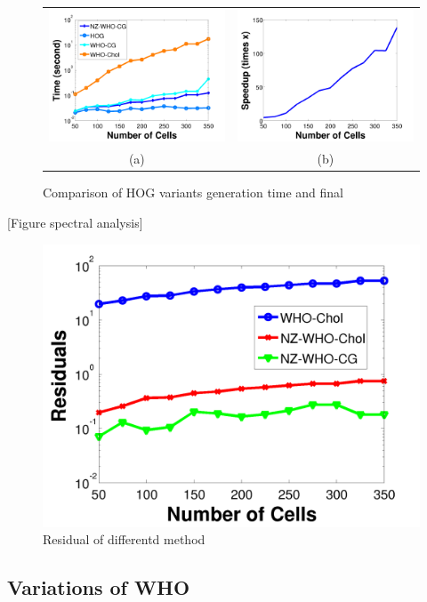 \documentclass[10pt,twocolumn,letterpaper]{article}
\begin{document}
\begin{figure}[t]
  \begin{center}
  \begin{tabular}{cc}
     \includegraphics[width=0.5\linewidth]{whotime} & 
     \includegraphics[width=0.5\linewidth]{speedup}\\
     (a) & (b) \\
 \end{tabular}
  \end{center}
  \caption{Comparison of HOG variants generation time and final }
  \label{fig:whotime}
\end{figure}

[Figure spectral analysis]

\begin{figure}[t]
  \centering
  \includegraphics[width=0.5\linewidth]{residual}
  \caption{Residual of differentd method}
  \label{fig:whotime}
\end{figure}

\subsection{Variations of WHO}
\end{document}
